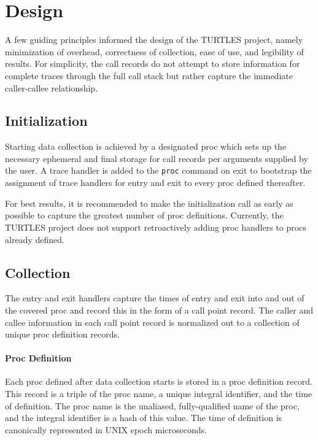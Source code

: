 \documentclass{article}[letter,10pt]
\begin{document}
\section{Design}{
  A few guiding principles informed the design of the TURTLES project, namely
  minimization of overhead, correctness of collection, ease of use, and legibility
  of results. For simplicity, the call records do not attempt to store information
  for complete traces through the full call stack but rather capture the immediate
  caller-callee relationship.

  \subsection{Initialization}{
    Starting data collection is achieved by a designated proc which sets up
    the necessary ephemeral and final storage for call records per arguments
    supplied by the user. A trace handler is added to the \texttt{proc} command on exit
    to bootstrap the assignment of trace handlers for entry and exit to every
    proc defined thereafter.

    For best results, it is recommended to make the initialization call as early
    as possible to capture the greatest number of proc definitions. Currently,
    the TURTLES project does not support retroactively adding proc handlers
    to procs already defined.

  }
  \subsection{Collection}{
    The entry and exit handlers capture the times of entry and exit into and out of
    the covered proc and record this in the form of a call point record. The caller
    and callee information in each call point record is normalized out to a collection
    of unique proc definition records.

    \paragraph{Proc Definition}{
      Each proc defined after data collection starts is stored in a proc definition
      record. This record is a triple of the proc name, a unique integral identifier,
      and the time of definition. The proc name is the unaliased, fully-qualified
      name of the proc, and the integral identifier is a hash of this value.
      The time of definition is canonically represented in UNIX epoch microseconds.
    }
}}
\end{document}

